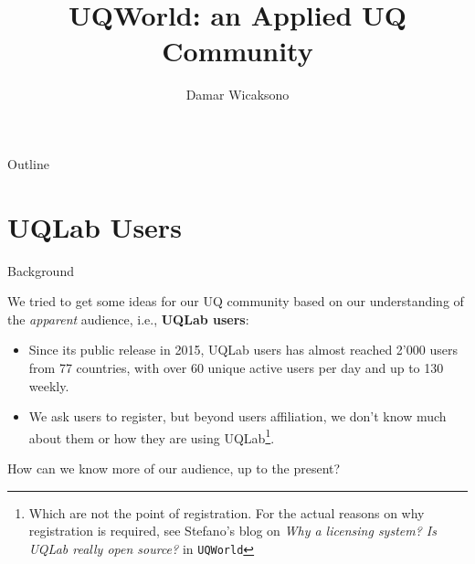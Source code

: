 \documentclass[]{rsuqbeamernew}
\title[UQWorld]{UQWorld: an Applied UQ Community}
\author[D. Wicaksono]{Damar Wicaksono}
\institute[RSUQ, ETH Z\"urich]{Chair of Risk, Safety and Uncertainty 
Quantification -- ETH Z\"urich}
\date[09.05.2019]
\begin{document}
\begin{frame}{Outline}

\tableofcontents

\end{frame}

\section{UQLab Users}

\begin{frame}{Background}

We tried to get some ideas for our UQ community based on
our understanding of the \emph{apparent} audience, i.e., \textbf{UQLab users}: 

\begin{itemize}
  \item Since its public release in 2015, UQLab users has almost reached 2'000 users from 77 countries,
  with over 60 unique active users per day and up to 130 weekly.
  \item We ask users to register, but beyond users affiliation,
  we don't know much about them or how they are using UQLab\footnote{Which are not the point of registration.
  For the actual reasons on why registration is required,
  see Stefano's blog on \emph{Why a licensing system? Is UQLab really open source?}
  in \texttt{UQWorld}}.
\end{itemize}

How can we know more of our audience, up to the present?

\end{frame}
\end{document}
